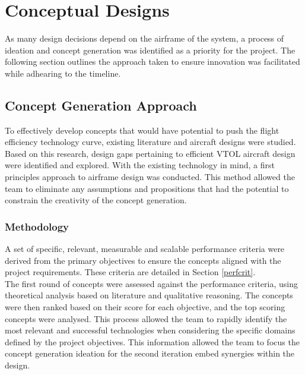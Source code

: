 \section{Conceptual Designs}

As many design decisions depend on the airframe of the system, a process of ideation and concept generation was identified as a priority for the project. The following section outlines the approach taken to ensure innovation was facilitated while adhearing to the timeline.

\subsection{Concept Generation Approach}
\label{sec:Concept_Generation_Approach}


To effectively develop concepts that would have potential to push the flight efficiency technology curve, existing literature and aircraft designs were studied. Based on this research, design gaps pertaining to efficient VTOL aircraft design were identified and explored. With the existing technology in mind, a first principles approach to airframe design was conducted. This method allowed the team to eliminate any assumptions and propositions that had the potential to constrain the creativity of the concept generation.

\subsubsection{Methodology}

A set of specific, relevant, measurable and scalable performance criteria were derived from the primary objectives to ensure the concepts aligned with the project requirements. These criteria are detailed in Section \ref{perfcrit}.\\

The first round of concepts were assessed against the performance criteria, using theoretical analysis based on literature and qualitative reasoning. The concepts were then ranked based on their score for each objective, and the top scoring concepts were analysed. This process allowed the team to rapidly identify the most relevant and successful technologies when considering the specific domains defined by the project objectives. This information allowed the team to focus the concept generation ideation for the second iteration embed synergies within the design.\\


